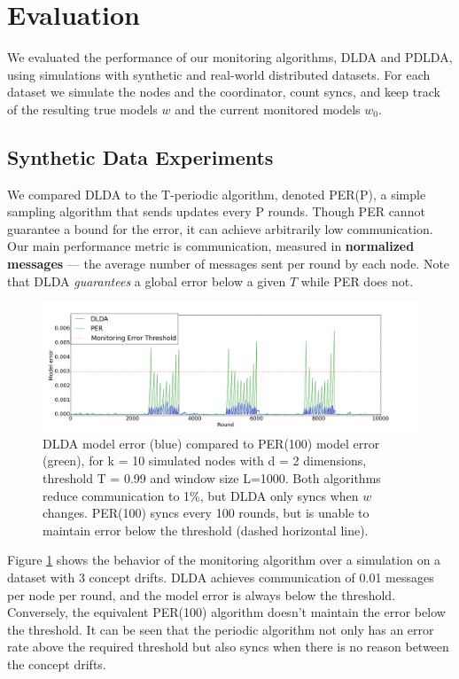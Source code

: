 \documentclass[11pt,twocolumn,varwidth=true,a4paper,fleqn]{article}
\begin{document}
\section{Evaluation}
We evaluated the performance of our monitoring algorithms,
DLDA and PDLDA, using simulations with synthetic and real-world 
distributed datasets. For each dataset we simulate the nodes and the coordinator, 
count syncs, and keep track of the resulting true models $w$ and the
current monitored models $w_0$. 
\subsection{Synthetic Data Experiments}
We compared DLDA to the T-periodic algorithm, denoted
PER(P), a simple sampling algorithm that sends updates
every P rounds. Though PER cannot guarantee a bound for the
error, it can achieve arbitrarily low communication.
Our main performance metric is communication, measured
in \textbf{normalized messages} --- the average number of messages sent per
round by each node. Note that DLDA \textit{guarantees}
a global error below a given $T$ while PER does not.

\begin{figure}[ht]
	\centering
	\includegraphics[width=\textwidth]{PER/PERvsDLDAoverTime.png}
	\caption{ DLDA model error (blue) compared to PER(100) model error (green), 
	for k = 10 simulated nodes with d = 2 dimensions, threshold T = 0.99 and
	window size L=1000. Both algorithms reduce communication to 1\%, but DLDA
	only syncs when $w$ changes. PER(100) syncs every 100 rounds, 
	but is unable to maintain error below the threshold (dashed horizontal line).}
	\label{PERvsDLDAoverTime}
\end{figure}
	
Figure \ref{PERvsDLDAoverTime} shows the behavior of the monitoring 
algorithm over a simulation on a dataset with 3 concept drifts. 
DLDA achieves communication of 0.01 messages per node per round, and 
the model error is always below the threshold. 
Conversely, the equivalent PER(100) algorithm doesn't maintain the
error below the threshold. It can be seen that the periodic algorithm 
not only has an error rate above the required threshold but also
syncs when there is no reason between the concept drifts.
\end{document}
